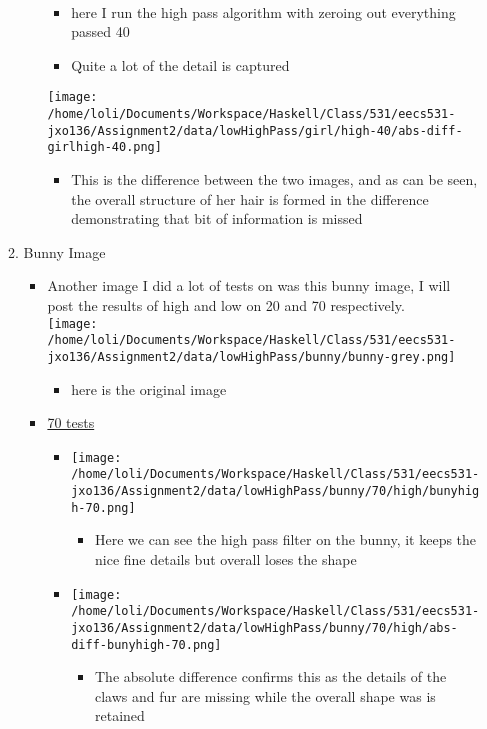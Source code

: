 \documentclass{article}
\begin{document}
\begin{enumerate}
\begin{enumerate}
\begin{itemize}
  \\
\begin{itemize}
\item here Ι run the high pass algorithm with zeroing out everything
passed 40
\item Quite a lot of the detail is captured
\end{itemize}
\texttt{[image: /home/loli/Documents/Workspace/Haskell/Class/531/eecs531-jxo136/Assignment2/data/lowHighPass/girl/high-40/abs-diff-girlhigh-40.png]}
\begin{itemize}
\item This is the difference between the two images, and as can be seen,
the overall structure of her hair is formed in the difference
demonstrating that bit of information is missed
\end{itemize}
\end{itemize}
\item Bunny Image
\label{sec-1-3-2}
\begin{itemize}
\item Another image I did a lot of tests on was this bunny image, I will
post the results of high and low on 20 and 70 respectively. \\
  \texttt{[image: /home/loli/Documents/Workspace/Haskell/Class/531/eecs531-jxo136/Assignment2/data/lowHighPass/bunny/bunny-grey.png]}
\begin{itemize}
\item here is the original image
\end{itemize}
\item \uline{70 tests}
\begin{itemize}
\item \texttt{[image: /home/loli/Documents/Workspace/Haskell/Class/531/eecs531-jxo136/Assignment2/data/lowHighPass/bunny/70/high/bunyhigh-70.png]}
\begin{itemize}
\item Here we can see the high pass filter on the bunny, it keeps the
nice fine details but overall loses the shape
\end{itemize}
\item \texttt{[image: /home/loli/Documents/Workspace/Haskell/Class/531/eecs531-jxo136/Assignment2/data/lowHighPass/bunny/70/high/abs-diff-bunyhigh-70.png]}
\begin{itemize}
\item The absolute difference confirms this as the details of the
claws and fur are missing while the overall shape was is retained

\end{itemize}
\end{itemize}
\end{itemize}
\end{enumerate}
\end{enumerate}
\end{document}
